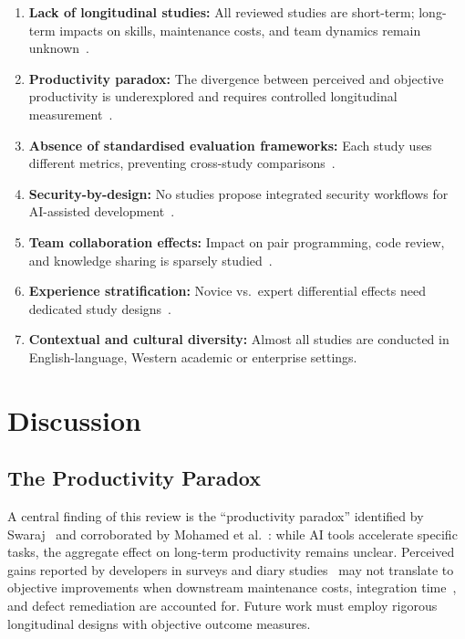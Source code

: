 \documentclass[journal,twoside,10pt]{IEEEtran}
\begin{document}
\begin{enumerate}
  \item \textbf{Lack of longitudinal studies:} All reviewed studies are
        short-term; long-term impacts on skills, maintenance costs, and team
        dynamics remain unknown~\cite{mohamed2025slr,swaraj2025llm}.
  \item \textbf{Productivity paradox:} The divergence between perceived and
        objective productivity is underexplored and requires controlled
        longitudinal measurement~\cite{swaraj2025llm}.
  \item \textbf{Absence of standardised evaluation frameworks:} Each study
        uses different metrics, preventing cross-study
        comparisons~\cite{swaraj2025llm,olivares2025meta}.
  \item \textbf{Security-by-design:} No studies propose integrated security
        workflows for AI-assisted development~\cite{cotroneo2025defects}.
  \item \textbf{Team collaboration effects:} Impact on pair programming, code
        review, and knowledge sharing is sparsely studied~\cite{song2024opensource}.
  \item \textbf{Experience stratification:} Novice vs.\ expert differential
        effects need dedicated study designs~\cite{urs2025trust,ng2024publicsector}.
  \item \textbf{Contextual and cultural diversity:} Almost all studies are
        conducted in English-language, Western academic or enterprise settings.
\end{enumerate}

\section{Discussion}
\label{sec:discussion}

\subsection{The Productivity Paradox}

A central finding of this review is the ``productivity paradox'' identified by
Swaraj~\cite{swaraj2025llm} and corroborated by Mohamed et
al.~\cite{mohamed2025slr}: while AI tools accelerate specific tasks, the
aggregate effect on long-term productivity remains unclear. Perceived gains
reported by developers in surveys and diary studies~\cite{butler2024rct} may
not translate to objective improvements when downstream maintenance costs,
integration time~\cite{song2024opensource}, and defect remediation are
accounted for. Future work must employ rigorous longitudinal designs with
objective outcome measures.
\end{document}
